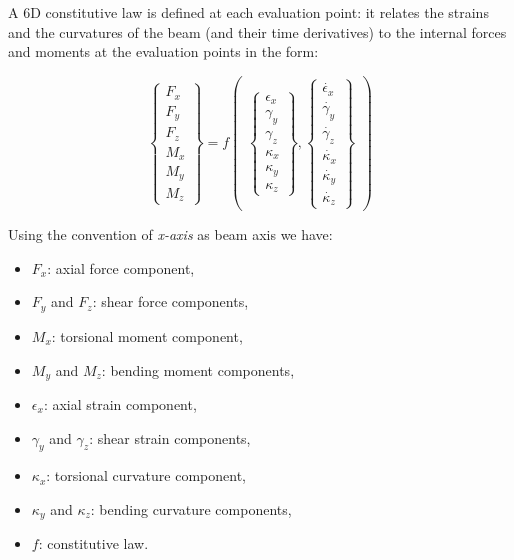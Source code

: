 A 6D constitutive law is defined at each evaluation point: it relates the strains and the curvatures of the beam (and their time derivatives) to the internal forces and moments at the evaluation points in the form:

\begin{equation}
	\begin{Bmatrix}
		F_x \\ F_y \\ F_z \\ M_x \\ M_y \\ M_z
	\end{Bmatrix} = f
	\begin{pmatrix}
		\begin{Bmatrix}
			\epsilon_x \\ \gamma_y \\ \gamma_z \\ \kappa_x \\ \kappa_y \\ \kappa_z
		\end{Bmatrix} , 
		\begin{Bmatrix}
			\dot{\epsilon_x} \\ \dot{\gamma_y} \\ \dot{\gamma_z} \\ \dot{\kappa_x} \\ \dot{\kappa_y} \\ \dot{\kappa_z}
		\end{Bmatrix}
	\end{pmatrix}
\end{equation}


Using the convention of \textit{x-axis} as beam axis we have:

\begin{itemize}
	\item $F_x$: axial force component,
	\item $F_y$ and $F_z$: shear force components,
	\item $M_x$: torsional moment component,
	\item $M_y$ and $M_z$: bending moment components,
	\item $\epsilon_x$: axial strain component,
	\item $\gamma_y$ and $\gamma_z$: shear strain components,
	\item $\kappa_x$: torsional curvature component,
	\item $\kappa_y$ and $\kappa_z$: bending curvature components,
	\item $f$: constitutive law.
\end{itemize}


